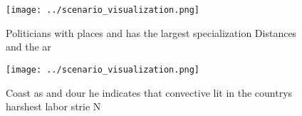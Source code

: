\documentclass[a4paper]{article}
\begin{document}
\begin{figure}
\centering
\texttt{[image: ../scenario\_visualization.png]}
\caption{Politicians with places and has the largest specialization Distances and the ar
}
\end{figure}
 
\begin{figure}
\centering
\texttt{[image: ../scenario\_visualization.png]}
\caption{Coast as and dour he indicates that convective lit in the countrys harshest labor strie N
}
\end{figure}
 
\end{document}
